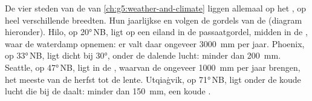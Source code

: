 \begin{example}\label{ex:g8:winds-global-circulation:four-towns}
De vier steden van de  van \cref{ch:g5:weather-and-climate}
liggen allemaal op het , op heel verschillende breedten.
Hun jaarlijkse  en  volgen de gordels van de 
(diagram hieronder). Hilo, op \ang{20}\,NB, ligt op een eiland in de
passaatgordel, midden in de , waar de  waterdamp
opnemen: er valt daar ongeveer \qty{3000}{mm} per jaar. Phoenix, op
\ang{33}\,NB, ligt dicht bij \ang{30}, onder de dalende lucht: minder dan
\qty{200}{mm}. Seattle, op \ang{47}\,NB, ligt in de , waarvan
de  ongeveer \qty{1000}{mm} per jaar brengen, het meeste van de
herfst tot de lente. Utqiaġvik, op \ang{71}\,NB, ligt onder de koude lucht
die bij de  daalt: minder dan \qty{150}{mm}, een koude .
\end{example}

